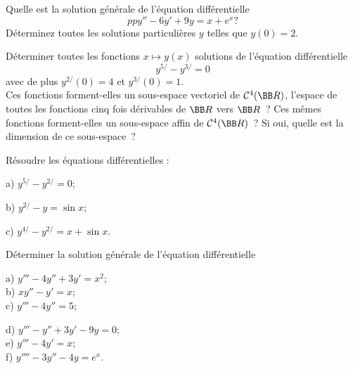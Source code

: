 \documentclass[12pt,french,oneside,a4paper]{memoir} %
\begin{document}
\begin{exo}
Quelle est la solution générale de l'équation
différentielle
\begin{equation*}
pp
y''-6y'+9y=x+e^x ?
\end{equation*}
Déterminez toutes les solutions particulières $y$ telles que
$y(0)=2$.
\end{exo}
\begin{exo}
Déterminer toutes les fonctions $x\mapsto y(x)$ solutions de
l'équation différentielle
$$
y^{5/}-y^{3/}=0
$$
avec de plus $y^{2/}(0)=4$ et $y^{3/}(0)=1$.\\
Ces fonctions forment-elles un sous-espace vectoriel de ${\mathcal
C}^4(\BB R)$, l'espace de toutes les fonctions cinq fois
dérivables de $\BB R$ vers $\BB R$~? Ces mêmes fonctions
forment-elles un sous-espace affin de ${\mathcal
C}^4(\BB R)$~? Si oui, quelle est la dimension de ce sous-espace~?
\end{exo}
\begin{exo}
Résoudre les équations différentielles :

a) $y^{5/}-y^{2/}=0$;

b) $y^{2/}-y=\sin x$;

c) $y^{4/}-y^{2/}=x+\sin x$.
\end{exo}
\begin{exo}
Déterminer la solution générale de l'équation
différentielle

\hfill
\begin{minipage}[t]{6cm}
a) $y'''-4y''+3y'=x^2$;\\
b) $xy''-y'=x$;\\
c) $y'''-4y''=5$;
\end{minipage}
\hfill
\begin{minipage}[t]{8cm}
d) $y'''-y''+3y'-9y=0$;\\
e) $y'''-4y'=x$;\\
f) $y''''-3y''-4y=e^x$.
\end{minipage}
\hfill
\end{exo}
\end{document}
